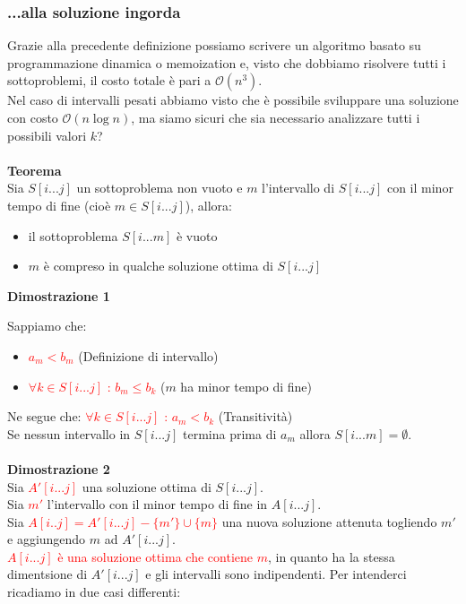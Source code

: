 \documentclass[../cheatSheetAlgoritmi.tex]{subfiles}
\begin{document}
\subsubsection{...alla soluzione ingorda}
Grazie alla precedente definizione possiamo scrivere un algoritmo basato su programmazione dinamica o memoization e, visto che dobbiamo risolvere tutti i sottoproblemi, il costo totale è pari a $\mathcal{O}(n^3)$.\\
Nel caso di intervalli pesati abbiamo visto che è possibile sviluppare una soluzione con costo $\mathcal{O}(n\log{n})$, ma siamo sicuri che sia necessario analizzare tutti i possibili valori $k$?\\\\
\textbf{Teorema}\\
Sia $S[i...j]$ un sottoproblema non vuoto e $m$ l’intervallo di $S[i ...j]$ con il minor tempo di fine (cioè $m \in S[i...j] $), allora:
\begin{itemize}
	\item il sottoproblema $S[i...m]$ è vuoto
	\item $m$ è compreso in qualche soluzione ottima di $S[i ...j]$
\end{itemize}
\newpage
\begin{flushleft}
\textbf{Dimostrazione 1}
\end{flushleft}
Sappiamo che:
\begin{itemize}
	\item  \textcolor{red}{$a_m < b_m$} (Definizione di intervallo)
	\item \textcolor{red}{$\forall k \in S[i...j]$ : $b_m \leq b_k$} ($m$ ha minor tempo di fine)
\end{itemize}
Ne segue che: \textcolor{red}{$\forall k \in S[i...j]$ : $a_m < b_k$} (Transitività)\\
Se nessun intervallo in $S[i...j]$ termina prima di $a_m$ allora $S[i...m] = \emptyset$.\\\\
\textbf{Dimostrazione 2}\\
Sia \textcolor{red}{$A'[i...j]$} una soluzione ottima di $S[i...j]$.\\
Sia \textcolor{red}{$m'$} l'intervallo con il minor tempo di fine in $A[i...j]$.\\
Sia \textcolor{red}{$A[i..j] = A'[i...j] - \{ m' \} \cup \{ m \}$} una nuova soluzione attenuta togliendo $m'$ e aggiungendo $m$ ad $A'[i...j]$.\\
\textcolor{red}{$A[i...j]$ è una soluzione ottima che contiene $m$}, in quanto ha la stessa dimentsione di $A'[i...j]$ e gli intervalli sono indipendenti. Per intenderci ricadiamo in due casi differenti:
\end{document}
